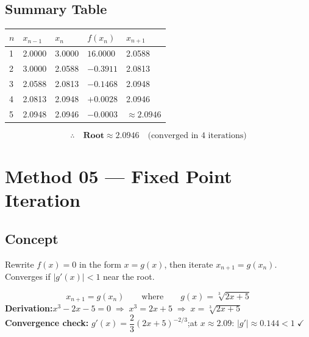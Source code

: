 \documentclass[12pt]{article}
\newcommand{\hcell}[1]{\textbf{\color{white}#1}}
\begin{document}
\subsection*{Summary Table}
\begin{center}
\begin{tabular}{C{0.8cm} C{2cm} C{2cm} C{2.2cm} C{2.2cm}}
\toprule
{}
\hcell{$n$} & \hcell{$x_{n-1}$} & \hcell{$x_n$} & \hcell{$f(x_n)$} & \hcell{$x_{n+1}$} \\
\midrule
{}
1 & 2.0000 & 3.0000 & $16.0000$  & 2.0588 \\
2 & 3.0000 & 2.0588 & $-0.3911$  & 2.0813 \\
3 & 2.0588 & 2.0813 & $-0.1468$  & 2.0948 \\
4 & 2.0813 & 2.0948 & $+0.0028$  & 2.0946 \\
5 & 2.0948 & 2.0946 & $-0.0003$  & $\approx 2.0946$ \\
\bottomrule
\end{tabular}
\end{center}
\[
  \therefore\quad \textbf{Root} \approx \mathbf{2.0946} \quad\text{(converged in 4 iterations)}
\]

\newpage

\section{Method 05 --- Fixed Point Iteration}

\subsection*{Concept}
\begin{conceptbox}
Rewrite $f(x)=0$ in the form $x=g(x)$, then iterate $x_{n+1}=g(x_n)$. Converges if $|g'(x)|<1$ near the root.
\end{conceptbox}

\vspace{8pt}

\begin{formulabox}
\[
  x_{n+1} = g(x_n) \qquad\text{where}\qquad g(x) = \sqrt[3]{2x+5}
\]
\vspace{-4pt}
\textbf{Derivation:}\;$x^3-2x-5=0\;\Rightarrow\;x^3=2x+5\;\Rightarrow\;x=\sqrt[3]{2x+5}$\\[4pt]
\textbf{Convergence check:}\;
$g'(x)=\dfrac{2}{3}(2x+5)^{-2/3}$;\;at $x\approx2.09$:\;
$|g'|\approx0.144<1\;\checkmark$
\end{formulabox}
\end{document}
